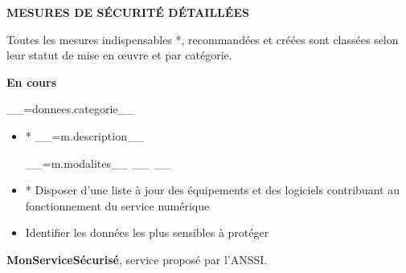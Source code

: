 \documentclass[9pt, a4paper]{article}
\begin{document}
  \textbf{MESURES DE SÉCURITÉ DÉTAILLÉES}

  \textcolor{gris}{Toutes les mesures indispensables *, recommandées et créées sont classées selon
  leur statut de mise en œuvre et par catégorie.}

  \vskip 0.5cm

  \textbf{En cours}

  \begin{tcolorbox}[colback=white, colframe=lisere, boxrule=1px]
    \textcolor{bleu}{__=donnees.categorie__}
    \begin{itemize}
      __~ donnees.mesures :m __
        \item * __=m.description__

          \textcolor{gris}{__=m.modalites__}
      __~__
      \item * Disposer d'une liste à jour des équipements et des logiciels contribuant au
        fonctionnement du service numérique
      \item Identifier les données les plus sensibles à protéger
    \end{itemize}
  \end{tcolorbox}

  \vskip 1cm

  \textcolor{bleu}{\textbf{MonServiceSécurisé}}, service proposé par l'ANSSI.
\end{document}
